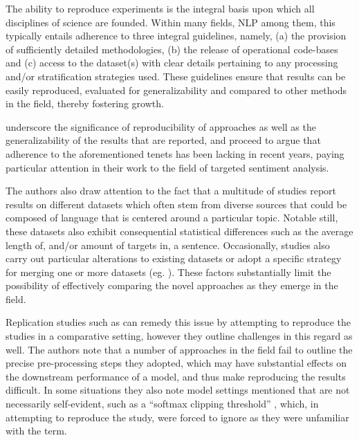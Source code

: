 \documentclass[../../fyp.tex]{subfiles}
\begin{document}
The ability to reproduce experiments is the integral basis upon which all disciplines of science are founded. Within many fields, NLP among them, this typically entails adherence to three integral guidelines, namely, (a) the provision of sufficiently detailed methodologies, (b) the release of operational code-bases and (c) access to the dataset(s) with clear details pertaining to any processing and/or stratification strategies used. These guidelines ensure that results can be easily reproduced, evaluated for generalizability and compared to other methods in the field, thereby fostering growth.

\citet{moore2018} underscore the significance of reproducibility of approaches as well as the generalizability of the results that are reported, and proceed to argue that adherence to the aforementioned tenets has been lacking in recent years, paying particular attention in their work to the field of targeted sentiment analysis.

The authors also draw attention to the fact that a multitude of studies report results on different datasets which often stem from diverse sources that could be composed of language that is centered around a particular topic. Notable still, these datasets also exhibit consequential statistical differences such as the average length of, and/or amount of targets in, a sentence. Occasionally, studies also carry out particular alterations to existing datasets or adopt a specific strategy for merging one or more datasets (eg. \citet{xue2018}). These factors substantially limit the possibility of effectively comparing the novel approaches as they emerge in the field.

Replication studies such as \citet{moore2018} can remedy this issue by attempting to reproduce the studies in a comparative setting, however they outline challenges in this regard as well. The authors note that a number of approaches in the field fail to outline the precise pre-processing steps they adopted, which may have substantial effects on the downstream performance of a model, and thus make reproducing the results difficult. In some situations they also note model settings mentioned that are not necessarily self-evident, such as a \enquote{softmax clipping threshold} \citep{tang2016b}, which, in attempting to reproduce the study, \citet{moore2018} were forced to ignore as they were unfamiliar with the term.
\end{document}
